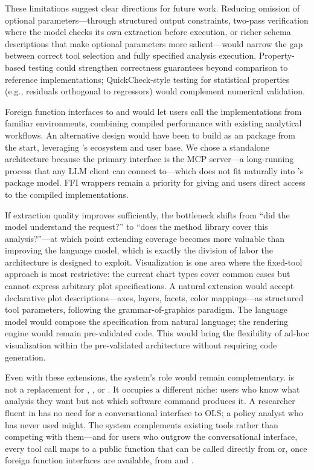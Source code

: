 These limitations suggest clear directions for future work. Reducing
omission of optional parameters---through structured output
constraints, two-pass verification where the model checks its own
extraction before execution, or richer schema descriptions that make
optional parameters more salient---would narrow the gap between
correct tool selection and fully specified analysis execution.
Property-based testing could strengthen correctness guarantees beyond
comparison to reference implementations; QuickCheck-style testing for
statistical properties (e.g., residuals orthogonal to regressors) would
complement numerical validation.

Foreign function interfaces to
 and  would let users call the
 implementations from familiar environments, combining
compiled performance with existing analytical workflows. An
alternative design would have been to build  as an
 package from the start, leveraging 's
ecosystem and user base. We chose a standalone architecture because the
primary interface is the MCP server---a long-running process that any
LLM client can connect to---which does not fit naturally into
's package model. FFI wrappers remain a priority for
giving  and  users direct access to the
compiled implementations.

If extraction
quality improves sufficiently, the bottleneck shifts from ``did the
model understand the request?'' to ``does the method library cover this
analysis?''---at which point extending coverage becomes more valuable
than improving the language model, which is exactly the division of
labor the architecture is designed to exploit. Visualization is one
area where the fixed-tool approach is most restrictive: the current
chart types cover common cases but cannot express arbitrary plot
specifications. A natural extension would accept declarative plot
descriptions---axes, layers, facets, color mappings---as structured
tool parameters, following the grammar-of-graphics paradigm. The
language model would compose the specification from natural language;
the rendering engine would remain pre-validated code. This would
bring the flexibility of ad-hoc visualization within the
pre-validated architecture without requiring code generation.

Even with these extensions, the system's role would remain
complementary.  is not a replacement for ,
, or . It occupies a different niche:
users who know what analysis they want but not which software command
produces it. A researcher fluent in  has no need for a
conversational interface to OLS; a policy analyst who has never used
 might. The system complements existing tools rather than
competing with them---and for users who outgrow the conversational
interface, every tool call maps to a public function that can be
called directly from  or, once foreign function
interfaces are available, from  and .

